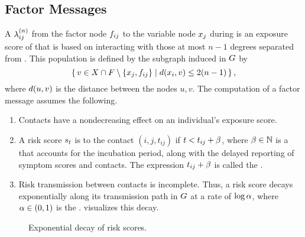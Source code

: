 \subsection{Factor Messages}

A  $\lambda_{ij}^{(n)}$ from the factor node $\vFactor[ij]$ to the variable node $\vVariable[j]$ during  is an exposure score of  that is based on interacting with those at most $n - 1$ degrees separated from . This population is defined by the subgraph induced in $G$ by
\begin{equation*}
  \setBuilder{v \in \vVariables \cap \vFactors \setminus \{\vVariable[j], \vFactor[ij]\}}{\dist(\vVariable[i], v) \leq 2(n - 1)},
\end{equation*}
where $d(u, v)$ is the distance between the nodes $u, v$. The computation of a factor message assumes the following.
\begin{enumerate}
  \item Contacts have a nondecreasing effect on an individual's exposure score.
  \item A risk score $s_t$ is  to the contact $(i, j, t_{ij})$ if $t < t_{ij} +\beta$, where $\beta \in \mathbb{N}$ is a  that accounts for the incubation period, along with the delayed reporting of symptom scores and contacts. The expression $t_{ij} +\beta$ is called the .
  \item Risk transmission between contacts is incomplete. Thus, a risk score decays exponentially along its transmission path in $G$ at a rate of $\log \alpha$, where $\alpha \in (0, 1)$ is the .  visualizes this decay.\end{enumerate}

\begin{figure}[htb]
\centering
{}
\caption[Exponential decay of risk scores]{Exponential decay of risk scores.}
\label{fig:decay}
\end{figure}

